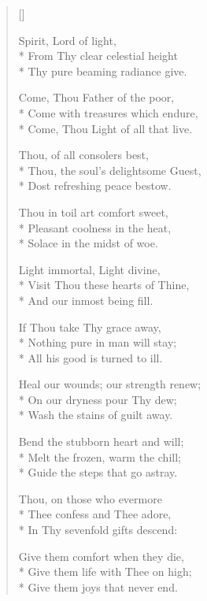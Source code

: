 \newHymn
{}

\begin{verse}[\versewidth]

 Spirit, Lord of light,\\*
From Thy clear celestial height\\*
Thy pure beaming radiance give.
\pointorig

Come, Thou Father of the poor,\\*
Come with treasures which endure,\\*
Come, Thou Light of all that live.

Thou, of all consolers best,\\*
Thou, the soul’s delightsome Guest,\\*
Dost refreshing peace bestow.

Thou in toil art comfort sweet,\\*
Pleasant coolness in the heat,\\*
Solace in the midst of woe.

Light immortal, Light divine,\\*
Visit Thou these hearts of Thine,\\*
And our inmost being fill.

If Thou take Thy grace away,\\*
Nothing pure in man will stay;\\*
All his good is turned to ill.

Heal our wounds; our strength renew;\\*
On our dryness pour Thy dew;\\*
Wash the stains of guilt away.

Bend the stubborn heart and will;\\*
Melt the frozen, warm the chill;\\*
Guide the steps that go astray.

Thou, on those who evermore\\*
Thee confess and Thee adore,\\*
In Thy sevenfold gifts descend:

Give them comfort when they die,\\*
Give them life with Thee on high;\\*
Give them joys that never end.

\end{verse}


